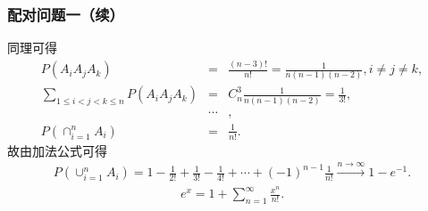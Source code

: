 \begin{frame}
	\frametitle{配对问题一（续）}
	同理可得
	\begin{eqnarray*}
		P(A_iA_jA_k)&=&\frac{(n-3)!}{n!}=\frac{1}{n(n-1)(n-2)}, i\neq j\neq k,\\
		\sum_{1\leq i<j<k\leq n}P(A_iA_jA_k)&=&C_n^3\frac{1}{n(n-1)(n-2)}=\frac{1}{3!},\\
		& \cdots& ,\\
		P(\cap_{i=1}^nA_i)&=&\frac{1}{n!}.
	\end{eqnarray*}
	\pause 故由加法公式可得
	\begin{eqnarray*}
		P(\cup_{i=1}^nA_i)=1-\frac{1}{2!}+\frac{1}{3!}-\frac{1}{4!}+\cdots+(-1)^{n-1}\frac{1}{n!}\stackrel{n\rightarrow \infty}{\longrightarrow} 1-e^{-1}.
	\end{eqnarray*}
	\pause
	\begin{eqnarray*}
		e^x=1+\sum_{n=1}^\infty\frac{x^n}{n!}.
	\end{eqnarray*}
\end{frame}

